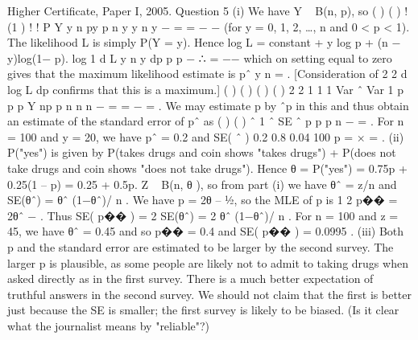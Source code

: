Higher Certificate, Paper I, 2005. Question 5
(i) We have Y ~ B(n, p), so ( ) ( ) ! (1 )
! !
P Y y n py p n y
y n y
− = = −
−
(for y = 0, 1, 2, …, n
and 0 < p < 1). The likelihood L is simply P(Y = y).
Hence log L = constant + y log p + (n − y)log(1− p).
log
1
d L y n y
dp p p
− ∴ = −−
which on setting equal to zero gives that the maximum
likelihood estimate is pˆ y
n
= . [Consideration of
2
2
d log L
dp
confirms that this is a
maximum.]
( ) ( ) ( ) ( )
2 2
1 1 1 Var ˆ Var 1
p p
p Y np p
n n n
−
= = − = . We may estimate p by ˆp in this and
thus obtain an estimate of the standard error of pˆ as ( ) ( ) ˆ 1 ˆ
SE ˆ
p p
p
n
−
= .
For n = 100 and y = 20, we have pˆ = 0.2 and SE( ˆ ) 0.2 0.8 0.04
100
p = × = .
(ii) P("yes") is given by P(takes drugs and coin shows "takes drugs") + P(does not
take drugs and coin shows "does not take drugs").
Hence θ = P("yes") = 0.75p + 0.25(1 – p) = 0.25 + 0.5p.
Z ~ B(n, θ ), so from part (i) we have θˆ = z/n and SE(θˆ) = θˆ (1−θˆ)/ n .
We have p = 2θ – ½, so the MLE of p is 1
2
p�� = 2θˆ − .
Thus SE( p�� ) = 2 SE(θˆ) = 2 θˆ (1−θˆ)/ n .
For n = 100 and z = 45, we have θˆ = 0.45 and so p�� = 0.4 and SE( p�� ) = 0.0995 .
(iii) Both p and the standard error are estimated to be larger by the second survey.
The larger p is plausible, as some people are likely not to admit to taking drugs when
asked directly as in the first survey. There is a much better expectation of truthful
answers in the second survey. We should not claim that the first is better just because
the SE is smaller; the first survey is likely to be biased. (Is it clear what the journalist
means by "reliable"?)
